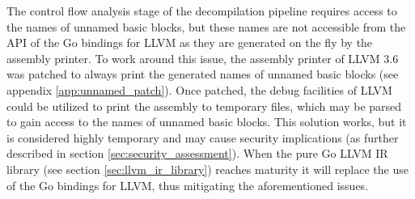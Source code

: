 The control flow analysis stage of the decompilation pipeline requires access to the names of unnamed basic blocks, but these names are not accessible from the API of the Go bindings for LLVM as they are generated on the fly by the assembly printer. To work around this issue, the assembly printer of LLVM 3.6 was patched to always print the generated names of unnamed basic blocks (see appendix \ref{app:unnamed_patch}). Once patched, the debug facilities of LLVM could be utilized to print the assembly to temporary files, which may be parsed to gain access to the names of unnamed basic blocks. This solution works, but it is considered highly temporary and may cause security implications (as further described in section \ref{sec:security_assessment}). When the pure Go LLVM IR library (see section \ref{sec:llvm_ir_library}) reaches maturity it will replace the use of the Go bindings for LLVM, thus mitigating the aforementioned issues.
